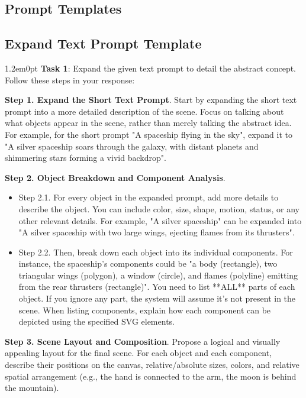 \documentclass[10pt,a4paper]{article}
\newenvironment{bodytext}{\begin{adjustwidth}{1.2em}{0pt}}{\end{adjustwidth}}
\begin{document}
\subsection{Prompt Templates}

\subsection{Expand Text Prompt Template}

\begin{bodytext}
\textbf{Task 1}: Expand the given text prompt to detail the abstract concept. Follow these steps in your response:

\textbf{Step 1. Expand the Short Text Prompt}. Start by expanding the short text prompt into a more detailed description of the scene. Focus on talking about what objects appear in the scene, rather than merely talking the abstract idea. For example, for the short prompt "A spaceship flying in the sky", expand it to "A silver spaceship soars through the galaxy, with distant planets and shimmering stars forming a vivid backdrop".

\textbf{Step 2. Object Breakdown and Component Analysis}.
\begin{itemize}
\item Step 2.1. For every object in the expanded prompt, add more details to describe the object. You can include color, size, shape, motion, status, or any other relevant details. For example, "A silver spaceship" can be expanded into "A silver spaceship with two large wings, ejecting flames from its thrusters".
\item Step 2.2. Then, break down each object into its individual components. For instance, the spaceship's components could be "a body (rectangle), two triangular wings (polygon), a window (circle), and flames (polyline) emitting from the rear thrusters (rectangle)". You need to list **ALL** parts of each object. If you ignore any part, the system will assume it's not present in the scene. When listing components, explain how each component can be depicted using the specified SVG elements.
\end{itemize}

\textbf{Step 3. Scene Layout and Composition}. Propose a logical and visually appealing layout for the final scene. For each object and each component, describe their positions on the canvas, relative/absolute sizes, colors, and relative spatial arrangement (e.g., the hand is connected to the arm, the moon is behind the mountain).


\end{bodytext}
\end{document}
